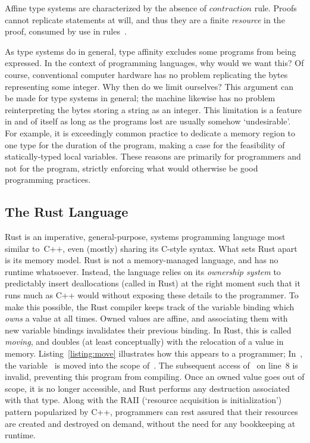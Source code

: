 Affine type systems are characterized by the absence of $contraction$ rule. Proofs cannot replicate statements at will, and thus they are a finite \textit{resource} in the proof, consumed by use in rules~\cite{walker2005substructural}.

As type systems do in general, type affinity excludes some programs from being expressed. In the context of programming languages, why would we want this? Of course, conventional computer hardware has no problem replicating the bytes representing some integer. Why then do we limit ourselves? This argument can be made for type systems in general; the machine likewise has no problem reinterpreting the bytes storing a string as an integer. This limitation is a feature in and of itself as long as the programs lost are usually somehow `undesirable'. For example, it is exceedingly common practice to dedicate a memory region to one type for the duration of the program, making a case for the feasibility of statically-typed local variables. These reasons are primarily for programmers and not for the program, strictly enforcing what would otherwise be good programming practices. 


\subsection{The Rust Language}
\label{sec:rust_language}
Rust is an imperative, general-purpose, systems programming language most similar to~C++, even (mostly) sharing its C-style syntax. What sets Rust apart is its memory model. Rust is not a memory-managed language, and has no runtime whatsoever. Instead, the language relies on its \textit{ownership system} to predictably insert deallocations (called  in Rust) at the right moment such that it runs much as C++ would without exposing these details to the programmer.
To make this possible, the Rust compiler keeps track of the variable binding which \textit{owns} a value at all times. Owned values are affine, and associating them with new variable bindings invalidates their previous binding. In Rust, this is called \textit{moving}, and doubles (at least conceptually) with the relocation of a value in memory. Listing~\ref{listing:move} illustrates how this appears to a programmer; In~, the variable~ is moved into the scope of~. The subsequent access of~ on line~8 is invalid, preventing this program from compiling. Once an owned value goes out of scope, it is no longer accessible, and Rust performs any destruction associated with that type. Along with the RAII (`resource acquisition is initialization') pattern popularized by C++, programmers can rest assured that their resources are created and destroyed on demand, without the need for any bookkeeping at runtime.

